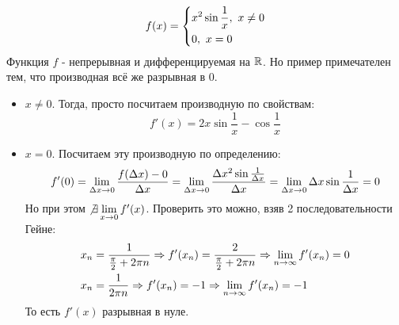\begin{example}
	\[
		f(x) = \left\{\begin{aligned}
			&{x^2 \sin \frac{1}{x},\ x \neq 0}
			\\
			&{0,\ x = 0}
		\end{aligned}\right.
	\]
	Функция $f$ - непрерывная и дифференцируемая на $\mathbb{R}$. Но пример примечателен тем, что производная всё же разрывная в 0.
	\begin{itemize}
		\item $x \neq 0$. Тогда, просто посчитаем производную по свойствам:
		\[
			f'(x) = 2x \sin \frac{1}{x} - \cos \frac{1}{x}
		\]
		
		\item $x = 0$. Посчитаем эту производную по определению:
		\[
			f'(0) = \lim\limits_{\Delta x \to 0} \frac{f(\Delta x) - 0}{\Delta x} = \lim\limits_{\Delta x \to 0} \frac{\Delta x^2 \sin \frac{1}{\Delta x}}{\Delta x} = \lim\limits_{\Delta x \to 0} \Delta x \sin \frac{1}{\Delta x} = 0
		\]
		Но при этом $\not\exists \lim\limits_{x \to 0} f'(x)$. Проверить это можно, взяв 2 последовательности Гейне:
		\begin{align*}
			&{x_n = \frac{1}{\frac{\pi}{2} + 2\pi n} \Rightarrow f'(x_n) = \frac{2}{\frac{\pi}{2} + 2\pi n} \Rightarrow \lim\limits_{n \to \infty} f'(x_n) = 0}
			\\
			&{x_n = \frac{1}{2\pi n} \Rightarrow f'(x_n) = -1 \Rightarrow \lim\limits_{n \to \infty} f'(x_n) = -1}
		\end{align*}
		То есть $f'(x)$ разрывная в нуле.
	\end{itemize}
\end{example}